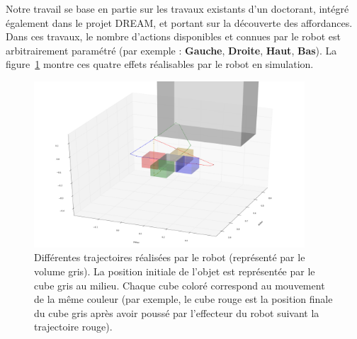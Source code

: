 \documentclass{llncs}
\begin{document}
Notre travail se base en partie sur les travaux existants d'un doctorant, intégré également dans le projet DREAM, et portant sur la découverte des affordances.
Dans ces travaux, le nombre d'actions disponibles et connues par le robot est arbitrairement paramétré (par exemple : \textbf{Gauche}, \textbf{Droite}, \textbf{Haut}, \textbf{Bas}). La figure~\ref{fig:trajectories} montre ces quatre effets réalisables par le robot en simulation.


\begin{figure}
  \begin{center}
    \includegraphics[width=0.9\textwidth]{figures/trajectories}
  \end{center}
  \caption{Différentes trajectoires réalisées par le robot (représenté par le volume gris). La position initiale de l'objet est représentée par le cube gris au milieu. Chaque cube coloré correspond au mouvement de la même couleur (par exemple, le cube rouge est la position finale du cube gris après avoir poussé par l'effecteur du robot suivant la trajectoire rouge).}
  \label{fig:trajectories}
\end{figure}
\end{document}
